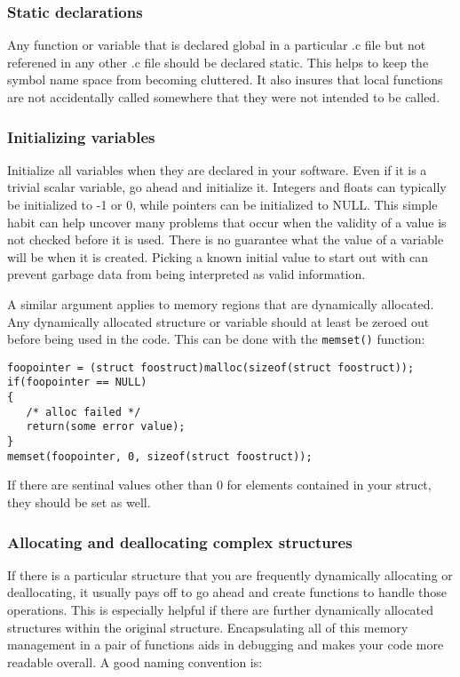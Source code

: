 \documentclass[11pt, letterpaper]{article}
\begin{document}
\subsubsection{Static declarations}

\label{sec:static}
Any function or variable that is declared global in a particular .c file
but not referened in any other .c file should be declared static.  This
helps to keep the symbol name space from becoming cluttered.  It also
insures that local functions are not accidentally called somewhere that
they were not intended to be called.
\subsubsection{Initializing variables}

Initialize all variables when they are declared in your software.  Even if it is a trivial
scalar variable, go ahead and initialize it.  Integers and floats can
typically be initialized to -1 or 0, while pointers can be initialized
to NULL.  This simple habit can help uncover many problems that occur
when the validity of a value is not checked before it is used.  There is
no guarantee what the value of a variable will be when it is
created.  Picking a known initial value to start out with can prevent
garbage data from being interpreted as valid information.

A similar argument applies to memory regions that are dynamically
allocated.  Any dynamically allocated structure or variable should at
least be zeroed out before being used in the code.  This can be done
with the {\tt memset()} function:

\begin{verbatim}
foopointer = (struct foostruct)malloc(sizeof(struct foostruct));
if(foopointer == NULL)
{
   /* alloc failed */
   return(some error value);
}
memset(foopointer, 0, sizeof(struct foostruct));
\end{verbatim}

If there are sentinal values other than 0 for elements contained in your
struct, they should be set as well.

\subsubsection{Allocating and deallocating complex structures}

If there is a particular structure that you are frequently dynamically
allocating or deallocating, it usually pays off to go ahead and create
functions to handle those operations.  This is especially helpful if
there are further dynamically allocated structures within the original
structure.  Encapsulating all of this memory management in a pair of
functions aids in debugging and makes your code more readable overall.
A good naming convention is:
\end{document}
